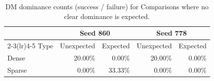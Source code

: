 \begin{table}
\caption{DM dominance counts (success / failure) for Comparisons where no clear dominance is expected.}
\begin{tabular}{lrrrr}
\toprule
& \multicolumn{2}{c}{Seed 860} & \multicolumn{2}{c}{Seed 778} \\
\cmidrule(lr){2-3}\cmidrule(lr){4-5}
Type & Unexpected & Expected & Unexpected & Expected \\
\midrule
Dense & 20.00\% & 0.00\% & 20.00\% & 0.00\% \\
Sparse & 0.00\% & 33.33\% & 0.00\% & 0.00\% \\
\bottomrule
\end{tabular}
\end{table}
